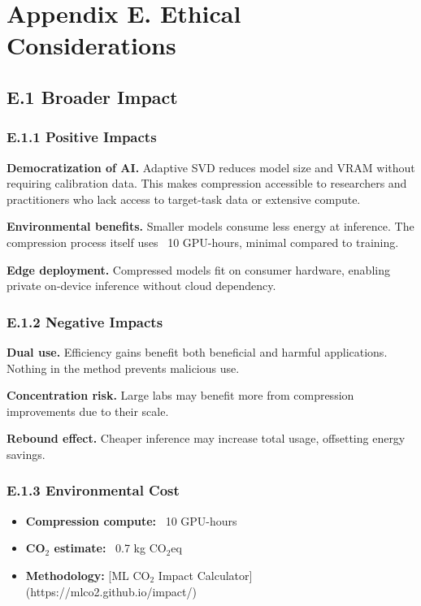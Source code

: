 
\section{Appendix E. Ethical Considerations}

\subsection{E.1 Broader Impact}

\subsubsection{E.1.1 Positive Impacts}

\textbf{Democratization of AI.} Adaptive SVD reduces model size and VRAM without 
requiring calibration data. This makes compression accessible to researchers 
and practitioners who lack access to target-task data or extensive compute.

\textbf{Environmental benefits.} Smaller models consume less energy at inference. 
The compression process itself uses ~10 GPU-hours, minimal 
compared to training.

\textbf{Edge deployment.} Compressed models fit on consumer hardware, enabling 
private on-device inference without cloud dependency.

\subsubsection{E.1.2 Negative Impacts}

\textbf{Dual use.} Efficiency gains benefit both beneficial and harmful 
applications. Nothing in the method prevents malicious use.

\textbf{Concentration risk.} Large labs may benefit more from compression 
improvements due to their scale.

\textbf{Rebound effect.} Cheaper inference may increase total usage, offsetting 
energy savings.

\subsubsection{E.1.3 Environmental Cost}

\begin{itemize}
\item \textbf{Compression compute:} ~10 GPU-hours
\item \textbf{CO$_2$ estimate:} ~0.7 kg CO$_2$eq
\item \textbf{Methodology:} [ML CO$_2$ Impact Calculator](https://mlco2.github.io/impact/)

\end{itemize}
